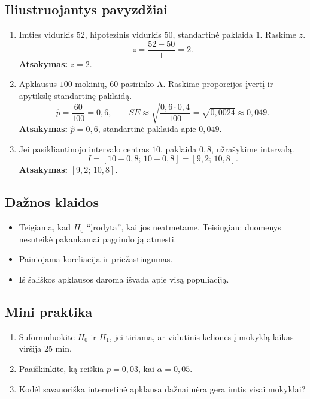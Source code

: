 \subsection{Iliustruojantys pavyzdžiai}
\begin{enumerate}[label=\arabic*.]
\item Imties vidurkis \(52\), hipotezinis vidurkis \(50\), standartinė paklaida \(1\). Raskime \(z\).
\[
z=\frac{52-50}{1}=2.
\]
\textbf{Atsakymas:} \(z=2\).

\item Apklausus \(100\) mokinių, \(60\) pasirinko A. Raskime proporcijos įvertį ir apytikslę standartinę paklaidą.
\[
\hat p=\frac{60}{100}=0{,}6,\qquad
SE\approx\sqrt{\frac{0{,}6\cdot0{,}4}{100}}=\sqrt{0{,}0024}\approx0{,}049.
\]
\textbf{Atsakymas:} \(\hat p=0{,}6\), standartinė paklaida apie \(0{,}049\).

\item Jei pasikliautinojo intervalo centras \(10\), paklaida \(0{,}8\), užrašykime intervalą.
\[
I=[10-0{,}8;\,10+0{,}8]=[9{,}2;\,10{,}8].
\]
\textbf{Atsakymas:} \([9{,}2;\,10{,}8]\).
\end{enumerate}

\subsection{Dažnos klaidos}
\begin{itemize}
\item Teigiama, kad \(H_0\) ``įrodyta'', kai jos neatmetame. Teisingiau: duomenys nesuteikė pakankamai pagrindo ją atmesti.
\item Painiojama koreliacija ir priežastingumas.
\item Iš šališkos apklausos daroma išvada apie visą populiaciją.
\end{itemize}

\subsection{Mini praktika}
\begin{enumerate}[label=\alph*)]
\item Suformuluokite \(H_0\) ir \(H_1\), jei tiriama, ar vidutinis kelionės į mokyklą laikas viršija \(25\) min.
\item Paaiškinkite, ką reiškia \(p=0{,}03\), kai \(\alpha=0{,}05\).
\item Kodėl savanoriška internetinė apklausa dažnai nėra gera imtis visai mokyklai?
\end{enumerate}

